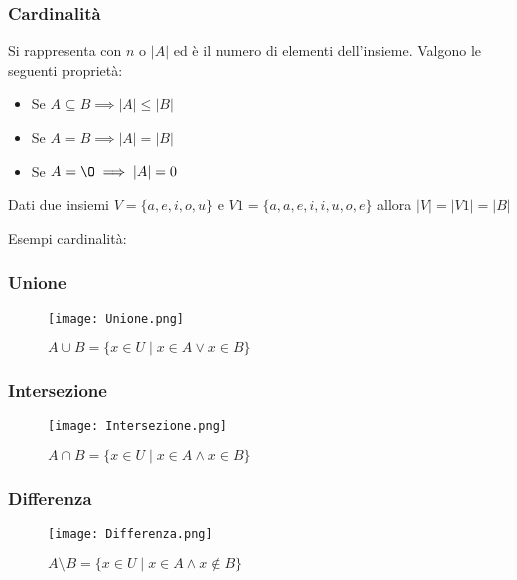 \subsubsection{Cardinalità}
\label{sec:cardinalita}
Si rappresenta con $n$ o $\lvert A \rvert$ ed è il numero di elementi dell'insieme. Valgono le seguenti proprietà:
\begin{itemize}
	\item Se $A \subseteq B \implies \lvert A \rvert \leq \lvert B \rvert$ 
	\item Se $A = B \implies \lvert A \rvert = \lvert B \rvert$
	\item Se $A = \O \implies \vert A \rvert = 0$
\end{itemize}
\begin{note}
	Dati due insiemi $V = \{a, e, i, o ,u\}$ e $V1 = \{a, a, e, i, i, u, o, e\}$ allora $\lvert V \rvert = \lvert V1 \rvert = \lvert B \rvert$
\end{note}
\begin{example}
    Esempi cardinalità:\\
\end{example}

\subsubsection{Unione}
\begin{figure}[h!]
	\centering
    \texttt{[image: Unione.png]}
    \caption{$A \cup B = \{x \in U \mid x \in A \lor x \in B\}$}
    \label{fig:unione}
\end{figure}

\subsubsection{Intersezione}
\begin{figure}[h!]
	\centering
	\texttt{[image: Intersezione.png]}
	\caption{$A \cap B = \{x \in U \mid x \in A \land x \in B\}$}
	\label{fig:intesezione}
\end{figure}
\newpage
\subsubsection{Differenza}
\begin{figure}[h!]
	\centering
	\texttt{[image: Differenza.png]}
	\caption{$A \setminus B = \{x \in U \mid x \in A \wedge x \notin B\}$}
	\label{fig:differenza}
\end{figure}

